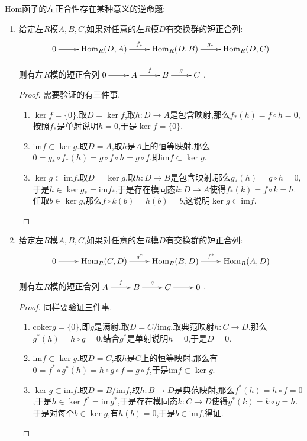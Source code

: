 Hom函子的左正合性存在某种意义的逆命题:
\begin{enumerate}
	\item 给定左$R$模$A,B,C$,如果对任意的左$R$模$D$有交换群的短正合列:
	$$\xymatrix{0\ar[r]&\mathrm{Hom}_R(D,A)\ar[r]^{f_*}&\mathrm{Hom}_R(D,B)\ar[r]^{g_*}&\mathrm{Hom}_R(D,C)}$$
	
	则有左$R$模的短正合列$\xymatrix{0\ar[r]&A\ar[r]^f&B\ar[r]^g&C}$.
	\begin{proof}
		
		需要验证的有三件事.
		\begin{enumerate}
			\item $\ker f=\{0\}$.取$D=\ker f$,取$h:D\to A$是包含映射,那么$f_*(h)=f\circ h=0$,按照$f_*$是单射说明$h=0$,于是$\ker f=\{0\}$.
			\item $\mathrm{im}f\subset\ker g$.取$D=A$,取$h$是$A$上的恒等映射.那么$0=g_*\circ f_*(h)=g\circ f\circ h=g\circ f$,即$\mathrm{im}f\subset\ker g$.
			\item $\ker g\subset\mathrm{im}f$.取$D=\ker g$,取$h:D\to B$是包含映射.那么$g_*(h)=g\circ h=0$,于是$h\in\ker g_*=\mathrm{im}f_*$,于是存在模同态$k:D\to A$使得$f_*(k)=f\circ k=h$.任取$b\in\ker g$,那么$f\circ k(b)=h(b)=b$,这说明$\ker g\subset\mathrm{im}f$.
		\end{enumerate}
	\end{proof}
	\item 给定左$R$模$A,B,C$,如果对任意的左$R$模$D$有交换群的短正合列:
	$$\xymatrix{0\ar[r]&\mathrm{Hom}_R(C,D)\ar[r]^{g^*}&\mathrm{Hom}_R(B,D)\ar[r]^{f^*}&\mathrm{Hom}_R(A,D)}$$
	
	则有左$R$模的短正合列$\xymatrix{A\ar[r]^f&B\ar[r]^g&C\ar[r]&0}$.
	\begin{proof}
		
		同样要验证三件事.
		\begin{enumerate}
			\item $\mathrm{coker}g=\{0\}$,即$g$是满射.取$D=C/\mathrm{im}g$,取典范映射$h:C\to D$,那么$g^*(h)=h\circ g=0$,结合$g^*$是单射说明$h=0$,于是$D=0$.
			\item $\mathrm{im}f\subset\ker g$.取$D=C$,取$h$是$C$上的恒等映射,那么有$0=f^*\circ g^*(h)=h\circ g\circ f=g\circ f$,于是$\mathrm{im}f\subset\ker g$.
			\item $\ker g\subset\mathrm{im}f$.取$D=B/\mathrm{im}f$,取$h:B\to D$是典范映射,那么$f^*(h)=h\circ f=0$,于是$h\in\ker f^*=\mathrm{im}g^*$,于是存在模同态$k:C\to D$使得$g^*(k)=k\circ g=h$.于是对每个$b\in\ker g$,有$h(b)=0$,于是$b\in\mathrm{im}f$,得证.
		\end{enumerate}
	\end{proof}
\end{enumerate}

